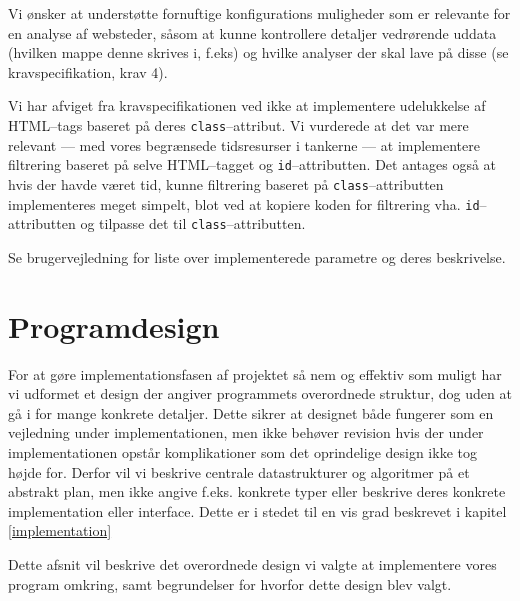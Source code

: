 \documentclass[a4paper,oneside]{memoir}
\begin{document}
Vi ønsker at understøtte fornuftige konfigurations muligheder som er
relevante for en analyse af websteder, såsom at kunne kontrollere
detaljer vedrørende uddata (hvilken mappe denne skrives i, f.eks) og
hvilke analyser der skal lave på disse (se kravspecifikation, krav 4).

Vi har afviget fra kravspecifikationen ved ikke at implementere
udelukkelse af HTML--tags baseret på deres
\texttt{class}--attribut. Vi vurderede at det var mere relevant ---
med vores begrænsede tidsresurser i tankerne --- at implementere
filtrering baseret på selve HTML--tagget og
\texttt{id}--attributten. Det antages også at hvis der havde været
tid, kunne filtrering baseret på \texttt{class}--attributten
implementeres meget simpelt, blot ved at kopiere koden for filtrering
vha. \texttt{id}--attributten og tilpasse det til
\texttt{class}--attributten.

Se brugervejledning for liste over implementerede parametre og deres
beskrivelse.

\chapter{Programdesign}

For at gøre implementationsfasen af projektet så nem og effektiv som
muligt har vi udformet et design der angiver programmets overordnede
struktur, dog uden at gå i for mange konkrete detaljer. Dette sikrer
at designet både fungerer som en vejledning under implementationen,
men ikke behøver revision hvis der under implementationen opstår
komplikationer som det oprindelige design ikke tog højde for. Derfor
vil vi beskrive centrale datastrukturer og algoritmer på et abstrakt
plan, men ikke angive f.eks. konkrete typer eller beskrive deres
konkrete implementation eller interface. Dette er i stedet til en vis
grad beskrevet i kapitel \ref{implementation}

Dette afsnit vil beskrive det overordnede design vi valgte at
implementere vores program omkring, samt begrundelser for hvorfor
dette design blev valgt.
\end{document}
